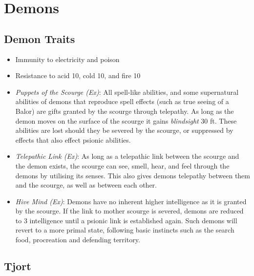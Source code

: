 \section{Demons}
\label{sec:Demons}

\subsection{Demon Traits}
\label{sec:Demon Traits}

\begin{itemize}[noitemsep]
  \item Immunity to electricity and poison
  \item Resistance to acid 10, cold 10, and fire 10
  \item \emph{Puppets of the Scourge (Ex)}: All spell-like abilities, and some
    supernatural abilities of demons that reproduce spell effects (such as
    true seeing of a Balor) are gifts granted by the scourge through
    telepathy.  As long as the demon moves on the surface of the scourge it
    gains \emph{blindsight} 30 ft. These abilities are lost should they be
    severed by the scourge, or suppressed by effects that also effect psionic
    abilities.
  \item \emph{Telepathic Link (Ex)}: As long as a telepathic link between the
    scourge and the demon exists, the scourge can see, smell, hear, and feel
    through the demons by utilising its senses. This also gives demons telepathy
    between them and the scourge, as well as between each other.
  \item \emph{Hive Mind (Ex)}: Demons have no inherent higher intelligence as it
    is granted by the scourge. If the link to mother scourge is severed,
    demons are reduced to 3 intelligence until a psionic link is established
    again. Such demons will revert to a more primal state, following basic
    instincts such as the search food, procreation and defending territory.
\end{itemize}

\subsection{Tjort}
\label{sec:Tjort}

